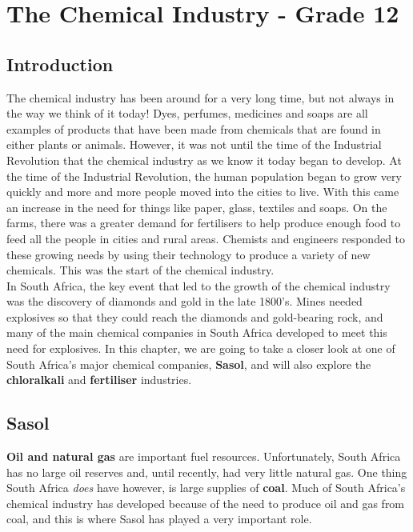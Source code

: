 


\chapter{The Chemical Industry - Grade 12}
\label{chap:chemindustry}

\section{Introduction}
\label{sec:chem:intro}

The chemical industry has been around for a very long time, but not always in the way we think of it today! Dyes, perfumes, medicines and soaps are all examples of products that have been made from chemicals that are found in either plants or animals. However, it was not until the time of the Industrial Revolution that the chemical industry as we know it today began to develop. At the time of the Industrial Revolution, the human population began to grow very quickly and more and more people moved into the cities to live. With this came an increase in the need for things like paper, glass, textiles and soaps. On the farms, there was a greater demand for fertilisers to help produce enough food to feed all the people in cities and rural areas. Chemists and engineers responded to these growing needs by using their technology to produce a variety of new chemicals. This was the start of the chemical industry.\\

In South Africa, the key event that led to the growth of the chemical industry was the discovery of diamonds and gold in the late 1800's. Mines needed explosives so that they could reach the diamonds and gold-bearing rock, and many of the main chemical companies in South Africa developed to meet this need for explosives. In this chapter, we are going to take a closer look at one of South Africa's major chemical companies, \textbf{Sasol}, and will also explore the \textbf{chloralkali} and \textbf{fertiliser} industries. 

\section{Sasol}
\label{sec:chemindustry:Sasol}

\textbf{Oil and natural gas} are important fuel resources. Unfortunately, South Africa has no large oil reserves and, until recently, had very little natural gas. One thing South Africa \textit{does} have however, is large supplies of \textbf{coal}. Much of South Africa's chemical industry has developed because of the need to produce oil and gas from coal, and this is where Sasol has played a very important role.\\

